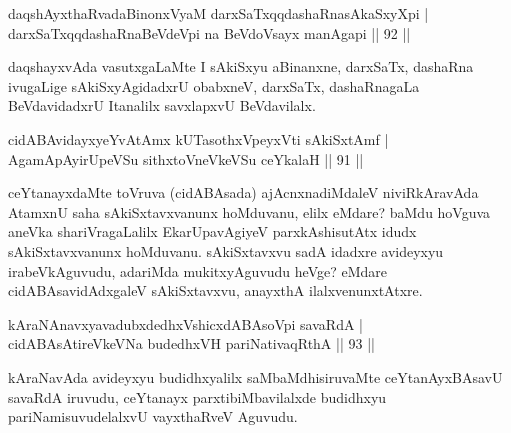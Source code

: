 
\begin{shl}
daqshAyxthaRvadaBinonxV\s yaM darxSaTxqqdashaRnasAkaSxyXpi | \\
darxSaTxqqdashaRnaBeVdeV\s pi na BeVdoV\s sayx manAgapi \hfill||  92 ||  
\end{shl}

\begin{artha}
daqshayxvAda vasutxgaLaMte I sAkiSxyu aBinanxne, darxSaTx, dashaRna ivugaLige sAkiSxyAgidadxrU obabxneV, darxSaTx, dashaRnagaLa BeVdavidadxrU Itanalilx savxlapxvU BeVdavilalx.
\end{artha}


\begin{shl}
cidABAvidayxyeYvA\s \s tAmx kUTasothxV\s peyxVti sAkiSxtAmf | \\
AgamApAyirUpeVSu sithxtoV\s neVkeVSu ceYkalaH \hfill||  91 ||  
\end{shl}

\begin{artha}
ceYtanayxdaMte toVruva (cidABAsada) ajAcnxnadiMdaleV niviRkAravAda AtamxnU saha sAkiSxtavxvanunx hoMduvanu, elilx eMdare? baMdu hoVguva aneVka shariVragaLalilx EkarUpavAgiyeV parxkAshisutAtx idudx sAkiSxtavxvanunx hoMduvanu. sAkiSxtavxvu sadA idadxre avideyxyu irabeVkAguvudu, adariMda mukitxyAguvudu heVge? eMdare cidABAsavidAdxgaleV sAkiSxtavxvu, anayxthA ilalxvenunxtAtxre. 
\end{artha}

\begin{shl}
kAraNAnavxyavadubxdedhxVshicxdABAsoV\s pi savaRdA | \\
cidABAsAtireVkeVNa budedhxVH pariNativaqRthA \hfill||  93 ||  
\end{shl}

\begin{artha}
kAraNavAda avideyxyu budidhxyalilx saMbaMdhisiruvaMte ceYtanAyxBAsavU savaRdA iruvudu, ceYtanayx parxtibiMbavilalxde budidhxyu pariNamisuvudelalxvU vayxthaRveV Aguvudu.
\end{artha}


